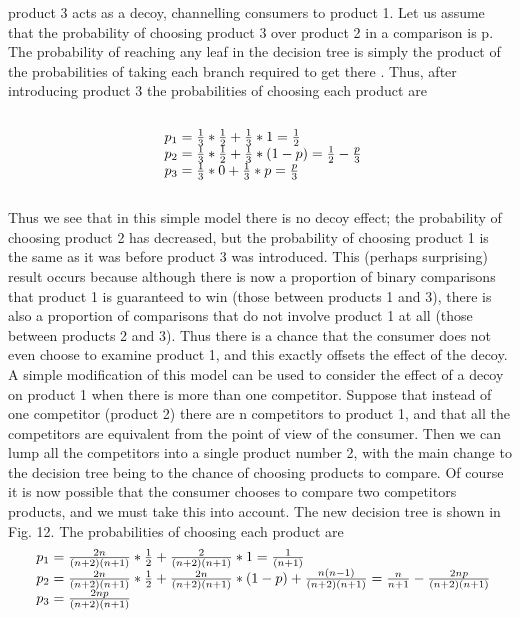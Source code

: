 product 3 acts as a decoy, channelling consumers to product 1. Let us assume that the probability of choosing
product 3 over product 2 in a comparison is p.\\
The probability of reaching any leaf in the decision tree is simply the product of the probabilities of
taking each branch required to get there    . Thus, after introducing product 3 the probabilities of choosing each product are\\
\\
\begin{equation} \label{eq:12}
\begin{array}{l@{}l}
p_1 = \frac{1}{3}*\frac{1}{2}+\frac{1}{3}*1 = \frac{1}{2} \\
p_2 = \frac{1}{3}*\frac{1}{2}+\frac{1}{3}*(1-p) = \frac{1}{2} - \frac{p}{3} \\
p_3 = \frac{1}{3}*0+\frac{1}{3}*p = \frac{p}{3}
\end{array}
\end{equation}
\\
Thus we see that in this simple model there is no decoy effect; the probability of choosing product 2 has decreased,
but the probability of choosing product 1 is the same as it was before product 3 was introduced.
This (perhaps surprising) result occurs because although there is now a proportion of binary comparisons
that product 1 is guaranteed to win (those between products 1 and 3), there is also a proportion of comparisons
that do not involve product 1 at all (those between products 2 and 3). Thus there is a chance that the consumer
does not even choose to examine product 1, and this exactly offsets the effect of the decoy.
A simple modification of this model can be used to consider the effect of a decoy on product 1 when
there is more than one competitor. Suppose that instead of one competitor (product 2) there are n competitors
to product 1, and that all the competitors are equivalent from the point of view of the consumer.
Then we can lump all the competitors into a single product number 2, with the main change to the decision tree
being to the chance of choosing products to compare. Of course it is now possible that the consumer
chooses to compare two competitors products, and we must take this into account. The new decision tree is shown in Fig. 12.
The probabilities of choosing each product are
\\
\begin{equation} \label{eq:13}
\begin{array}{l@{}l}
p_1 = \frac{2n}{(n+2)(n+1)}*\frac{1}{2}+\frac{2}{(n+2)(n+1)}*1 = \frac{1}{(n+1)} \\
p_2 = \frac{2n}{(n+2)(n+1)}*\frac{1}{2}+\frac{2n}{(n+2)(n+1)}*(1-p) + \frac{n(n-1)}{(n+2)(n+1)} = \frac{n}{n+1} - \frac{2np}{(n+2)(n+1)} \\
p_3 = \frac{2np}{(n+2)(n+1)}
\end{array}
\end{equation}
